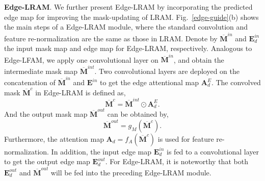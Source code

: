 \documentclass[10pt,journal,compsoc]{IEEEtran}
\begin{document}
{\textbf{Edge-LRAM}.} We further present Edge-LRAM by incorporating the predicted edge map for improving the mask-updating of LRAM.
%
Fig.~\ref{edge-guide}(b) shows the main steps of a Edge-LRAM module, where the standard convolution and feature re-normalization are the same as those in LRAM.
%
Denote by $\overline{\mathbf{M}}^{in}$ and $\mathbf{E}^{in}_d$ the input mask map and edge map for Edge-LRAM, respectively.
%
Analogous to Edge-LFAM, we apply one convolutional layer on $\overline{\mathbf{M}}^{in}$, and obtain the intermediate mask map $\overline{\mathbf{M}}^{int}$.
%
Two convolutional layers are deployed on the concatenation of $\overline{\mathbf{M}}^{in}$ and $\mathbf{E}^{in}$ to get the edge attentional map $\mathbf{A}^{E}_d$.
%
The convolved mask $\overline{\mathbf{M}}^{c}$ in Edge-LRAM is defined as,
%
\begin{equation}\label{eqn::mc_leram}
\overline{\mathbf{M}}^{c} = \overline{\mathbf{M}}^{int} \odot \mathbf{A}^{E}_d.
\end{equation}
%
And the output mask map $\overline{\mathbf{M}}^{out}$ can be obtained by,
%
\begin{equation}\label{eqn::mupdate_leram}
\overline{\mathbf{M}}^{out} = g_M(\overline{\mathbf{M}}^{c}).
\end{equation}
%
Furthermore, the attention map $\mathbf{A}_d = f_A(\overline{\mathbf{M}}^c)$ is used for feature re-normalization.
%
In addition, the input edge map $\mathbf{E}^{in}_d$ is fed to a convolutional layer to get the output edge map $\mathbf{E}^{out}_d$.
%
For Edge-LRAM, it is noteworthy that both $\mathbf{E}^{out}_d$ and $\overline{\mathbf{M}}^{out}$ will be fed into the preceding Edge-LRAM module.





%
%
%
%
\end{document}

